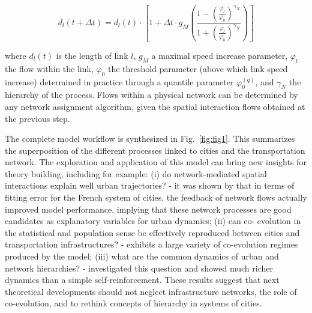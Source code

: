 \documentclass[10pt,letterpaper]{article}
\begin{document}
\begin{equation}
	d_l(t+ \Delta t) = d_l(t) \cdot \left[ 1 + \Delta t \cdot g_M \left( \frac{1 - \left(\frac{\varphi_l}{\varphi_0}\right)^{\gamma_N}}{1 + \left(\frac{\varphi_l}{\varphi_0}\right)^{\gamma_N}} \right) \right]	
\end{equation}

where $d_l(t)$ is the length of link $l$, $g_M$ a maximal speed increase parameter, $\varphi_l$ the flow within the link, $\varphi_0$ the threshold parameter (above which link speed increase) determined in practice through a quantile parameter $\varphi_0^{(q)}$, and $\gamma_N$ the hierarchy of the process. Flows within a physical network can be determined by any network assignment algorithm, given the spatial interaction flows obtained at the previous step.

The complete model workflow is synthesized in Fig.~\ref{fig:fig1}. This summarizes the superposition of the different processes linked to cities and the transportation network. The exploration and application of this model can bring new insights for theory building, including for example: (i) do network-mediated spatial interactions explain well urban trajectories? - it was shown by \citep{raimbault2020indirect} that in terms of fitting error for the French system of cities, the feedback of network flows actually improved model performance, implying that these network processes are good candidates as explanatory variables for urban dynamics; (ii) can co- evolution in the statistical and population sense be effectively reproduced between cities and transportation infrastructures? - \citep{raimbault2020modeling} exhibits a large variety of co-evolution regimes produced by the model; (iii) what are the common dynamics of urban and network hierarchies? - \citep{raimbault2020hierarchy} investigated this question and showed much richer dynamics than a simple self-reinforcement. These results suggest that next theoretical developments should not neglect infrastructure networks, the role of co-evolution, and to rethink concepts of hierarchy in systems of cities.
\end{document}
